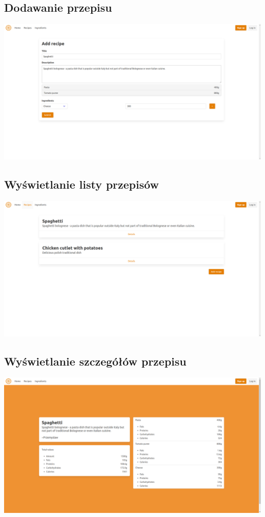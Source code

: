 \documentclass[11pt]{article}
\begin{document}
\subsection{Dodawanie przepisu}
\includegraphics[width=15.5cm]{add_recipe.png}
\subsection{Wyświetlanie listy przepisów}
\includegraphics[width=15.5cm]{list_of_recipes.png}
\subsection{Wyświetlanie szczegółów przepisu}
\includegraphics[width=15.5cm]{recipe_view.png}
\end{document}
